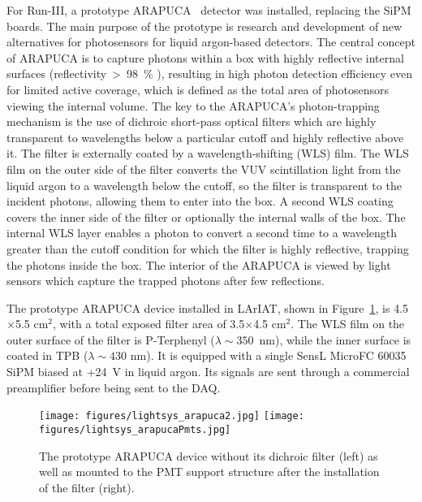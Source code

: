 For Run-III, a prototype ARAPUCA~\cite{lightsys-arapuca} detector was installed, replacing the SiPM boards. The main purpose of the prototype is research and development of new alternatives for photosensors for liquid argon-based detectors.
The central concept of ARAPUCA is to capture photons within a box with highly reflective internal surfaces (reflectivity~>~98~\% ), resulting in high photon detection efficiency even for limited active coverage, which is defined as the total area of photosensors viewing the internal volume. The key to the ARAPUCA's photon-trapping mechanism is the use of dichroic short-pass optical filters which are highly transparent to wavelengths below a particular cutoff and highly reflective above it. The filter is externally coated by a wavelength-shifting (WLS) film. The WLS film on the outer side of the filter converts the VUV scintillation light from the liquid argon to a wavelength below the cutoff, so the filter is transparent to the incident photons, allowing them to enter into the box. A second WLS coating covers the inner side of the filter or optionally the internal walls of the box. The internal WLS layer enables a photon to convert a second time to a wavelength greater than the cutoff condition for which the filter is highly reflective, trapping the photons inside the box. The interior of the ARAPUCA is viewed by light sensors which capture the trapped photons after few reflections.

The prototype ARAPUCA device installed in LArIAT, shown in Figure~\ref{fig:arapuca_photo}, is 4.5$\times$5.5 cm$^2$, with a total exposed filter area of 3.5$\times$4.5 cm$^2$.  The WLS film on the outer surface of the filter is P-Terphenyl ($\lambda \sim  350$~nm), while the inner surface is coated in TPB ($\lambda \sim 430$ nm). It is equipped with a single SensL MicroFC 60035 SiPM biased at +24~V in liquid argon.  Its signals are sent through a commercial preamplifier before being sent to the DAQ.

\begin{figure}
\centering
\texttt{[image: figures/lightsys\_arapuca2.jpg]}
\hspace{0.5cm}
\texttt{[image: figures/lightsys\_arapucaPmts.jpg]}
\caption{The prototype ARAPUCA device without its dichroic filter (left) as well as mounted to the PMT support structure after the installation of the filter (right).}
\label{fig:arapuca_photo}

\end{figure}

